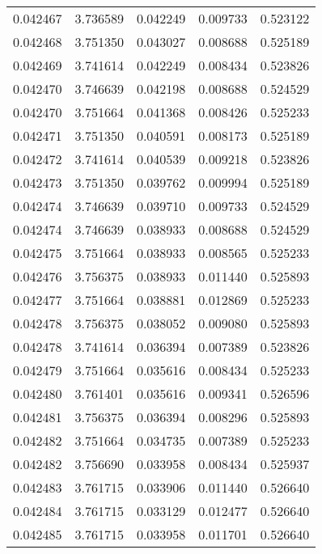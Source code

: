 \begin{tabular}{lrrrr}
0.042467    &  3.736589 &  0.042249 &  0.009733 &             0.523122 \\
0.042468    &  3.751350 &  0.043027 &  0.008688 &             0.525189 \\
0.042469    &  3.741614 &  0.042249 &  0.008434 &             0.523826 \\
0.042470    &  3.746639 &  0.042198 &  0.008688 &             0.524529 \\
0.042470    &  3.751664 &  0.041368 &  0.008426 &             0.525233 \\
0.042471    &  3.751350 &  0.040591 &  0.008173 &             0.525189 \\
0.042472    &  3.741614 &  0.040539 &  0.009218 &             0.523826 \\
0.042473    &  3.751350 &  0.039762 &  0.009994 &             0.525189 \\
0.042474    &  3.746639 &  0.039710 &  0.009733 &             0.524529 \\
0.042474    &  3.746639 &  0.038933 &  0.008688 &             0.524529 \\
0.042475    &  3.751664 &  0.038933 &  0.008565 &             0.525233 \\
0.042476    &  3.756375 &  0.038933 &  0.011440 &             0.525893 \\
0.042477    &  3.751664 &  0.038881 &  0.012869 &             0.525233 \\
0.042478    &  3.756375 &  0.038052 &  0.009080 &             0.525893 \\
0.042478    &  3.741614 &  0.036394 &  0.007389 &             0.523826 \\
0.042479    &  3.751664 &  0.035616 &  0.008434 &             0.525233 \\
0.042480    &  3.761401 &  0.035616 &  0.009341 &             0.526596 \\
0.042481    &  3.756375 &  0.036394 &  0.008296 &             0.525893 \\
0.042482    &  3.751664 &  0.034735 &  0.007389 &             0.525233 \\
0.042482    &  3.756690 &  0.033958 &  0.008434 &             0.525937 \\
0.042483    &  3.761715 &  0.033906 &  0.011440 &             0.526640 \\
0.042484    &  3.761715 &  0.033129 &  0.012477 &             0.526640 \\
0.042485    &  3.761715 &  0.033958 &  0.011701 &             0.526640 \\

\end{tabular}
